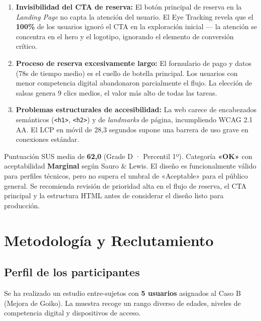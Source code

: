 \documentclass[11pt,a4paper]{article}
\begin{document}
\begin{enumerate}
  \item \textbf{Invisibilidad del CTA de reserva:} El botón principal de reserva en la
        \textit{Landing Page} no capta la atención del usuario. El Eye Tracking revela que
        el \textbf{100\%} de los usuarios ignoró el CTA en la exploración inicial —
        la atención se concentra en el hero y el logotipo, ignorando el elemento de
        conversión crítico.

  \item \textbf{Proceso de reserva excesivamente largo:} El formulario de pago y datos
        (78s de tiempo medio) es el cuello de botella principal. Los usuarios con menor
        competencia digital abandonaron parcialmente el flujo. La elección de salsas
        genera 9 clics medios, el valor más alto de todas las tareas.

  \item \textbf{Problemas estructurales de accesibilidad:} La web carece de encabezados
        semánticos (\texttt{<h1>}, \texttt{<h2>}) y de \textit{landmarks} de página,
        incumpliendo WCAG 2.1 AA. El LCP en móvil de 28,3 segundos supone una barrera
        de uso grave en conexiones estándar.
\end{enumerate}

\begin{keybox}
Puntuación SUS media de \textbf{62,0} (Grade D · Percentil 1º).
Categoría \textbf{«OK»} con aceptabilidad \textbf{Marginal} según Sauro \& Lewis.
El diseño es funcionalmente válido para perfiles técnicos, pero no supera el umbral
de «Aceptable» para el público general.
Se recomienda revisión de prioridad alta en el flujo de reserva, el CTA principal
y la estructura HTML antes de considerar el diseño listo para producción.
\end{keybox}

\section{Metodología y Reclutamiento}

\subsection{Perfil de los participantes}

Se ha realizado un estudio entre-sujetos con \textbf{5 usuarios} asignados al Caso B
(Mejora de Goiko). La muestra recoge un rango diverso de edades, niveles de competencia
digital y dispositivos de acceso.
\end{document}
